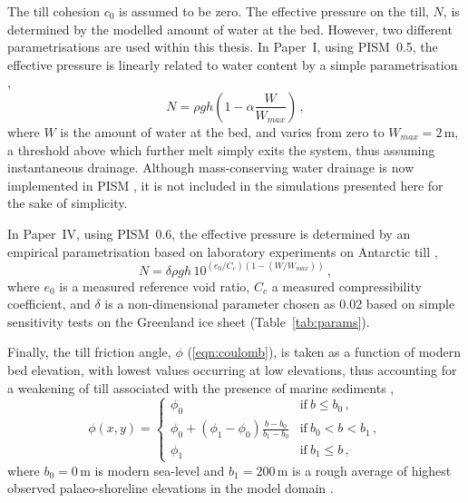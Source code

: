 \documentclass[a4paper]{kappa}
\newcommand{\CCLI}[0]{Paper~I}      %
\newcommand{\CCYC}[0]{Paper~IV}     %
\begin{document}
The till cohesion $c_0$ is assumed to be zero.
The effective pressure on the
till, $N$, is determined by the modelled amount of water at the bed. However,
two different parametrisations are used within this thesis. In {\CCLI}, using
PISM~0.5, the effective pressure is linearly related to water content by a
simple parametrisation \citep[Eq.~13]{Winkelmann.etal.2011},
\begin{equation}
    N = \rho gh (1 - \alpha \frac{W}{W_{max}}) \,,
\end{equation}
where $W$ is the amount of water at the bed, and varies from zero to
$W_{max}=2$\,m, a threshold above which further melt simply exits the system,
thus assuming instantaneous drainage. Although mass-conserving water drainage
is now implemented in PISM \citep{Bueler.Pelt.2014}, it is not included in the
simulations presented here for the sake of simplicity.

In {\CCYC}, using PISM~0.6, the effective pressure is determined by an
empirical parametrisation based on laboratory experiments on Antarctic till
\citep{Tulaczyk.etal.2000, Bueler.Pelt.2014},
\begin{equation}
    N = \delta \rho gh \, 10^{(e_0/C_c) (1 - (W/W_{max}))} \,,
\end{equation}
where $e_0$ is a measured reference void ratio, $C_c$ a measured
compressibility coefficient, and $\delta$ is a non-dimensional parameter
chosen as 0.02 based on simple sensitivity tests on the Greenland ice sheet
(Table~\ref{tab:params}).

Finally, the till friction angle, $\phi$ (\cref{eqn:coulomb}), is taken as a
function of modern bed
elevation, with lowest values occurring at low elevations, thus accounting for
a weakening of till associated with the presence of marine sediments
\citep[cf.][Eq.~10]{Martin.etal.2011},
\begin{equation}
    \phi(x,y) =
    \begin{cases}
        \phi_0 & \text{if}\ b \le b_0 \,, \\
        \phi_0 + (\phi_1-\phi_0) \frac{b - b_0}{b_1-b_0}
                & \text{if}\ b_0 < b < b_1 \,, \\
        \phi_1 & \text{if}\ b_1 \le b \,,
    \end{cases}
\end{equation}
where $b_0=0$\,m is modern sea-level and $b_1=200$\,m is a rough average of
highest observed palaeo-shoreline elevations in the model domain
\citep[\cref{tab:params};][]{Clague.James.2002}.
\end{document}
